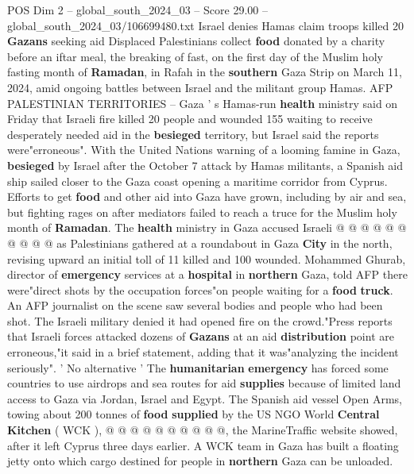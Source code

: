 \begin{textsample}{POS Dim 2 – global\_south\_2024\_03 – Score 29.00 – global\_south\_2024\_03/106699480.txt}  \label{ex:f2_pos_002}
Israel denies Hamas claim troops killed 20 \textbf{Gazans} seeking aid Displaced Palestinians collect \textbf{food} donated by a charity before an iftar meal, the breaking of fast, on the first day of the Muslim holy fasting month of \textbf{Ramadan}, in Rafah in the \textbf{southern} Gaza Strip on March 11, 2024, amid ongoing battles between Israel and the militant group Hamas.
AFP PALESTINIAN TERRITORIES -- Gaza ' s Hamas-run \textbf{health} ministry said on Friday that Israeli fire killed 20 people and wounded 155 waiting to receive desperately needed aid in the \textbf{besieged} territory, but Israel said the reports were"erroneous".
With the United Nations warning of a looming famine in Gaza, \textbf{besieged} by Israel after the October 7 attack by Hamas militants, a Spanish aid ship sailed closer to the Gaza coast opening a maritime corridor from Cyprus.
Efforts to get \textbf{food} and other aid into Gaza have grown, including by air and sea, but fighting rages on after mediators failed to reach a truce for the Muslim holy month of \textbf{Ramadan}.
The \textbf{health} ministry in Gaza accused Israeli @ @ @ @ @ @ @ @ @ @ as Palestinians gathered at a roundabout in Gaza \textbf{City} in the north, revising upward an initial toll of 11 killed and 100 wounded.
Mohammed Ghurab, director of \textbf{emergency} services at a \textbf{hospital} in \textbf{northern} Gaza, told AFP there were"direct shots by the occupation forces"on people waiting for a \textbf{food} \textbf{truck}.
An AFP journalist on the scene saw several bodies and people who had been shot.
The Israeli military denied it had opened fire on the crowd."Press reports that Israeli forces attacked dozens of \textbf{Gazans} at an aid \textbf{distribution} point are erroneous,"it said in a brief statement, adding that it was"analyzing the incident seriously". ' No alternative ' The \textbf{humanitarian} \textbf{emergency} has forced some countries to use airdrops and sea routes for aid \textbf{supplies} because of limited land access to Gaza via Jordan, Israel and Egypt.
The Spanish aid vessel Open Arms, towing about 200 tonnes of \textbf{food} \textbf{supplied} by the US NGO World \textbf{Central} \textbf{Kitchen} ( WCK ), @ @ @ @ @ @ @ @ @ @, the MarineTraffic website showed, after it left Cyprus three days earlier.
A WCK team in Gaza has built a floating jetty onto which cargo destined for people in \textbf{northern} Gaza can be unloaded.

\end{textsample}

